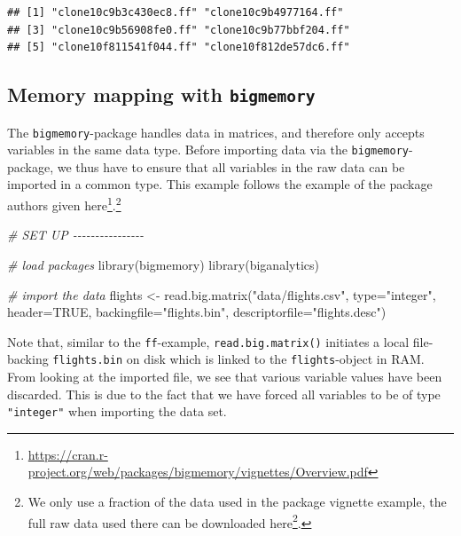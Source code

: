 \documentclass[
  12pt,
]{style/krantz}
\newenvironment{Shaded}{\begin{snugshade}}{\end{snugshade}}
\newcommand{\AttributeTok}[1]{\textcolor[rgb]{0.77,0.63,0.00}{#1}}
\newcommand{\CommentTok}[1]{\textcolor[rgb]{0.56,0.35,0.01}{\textit{#1}}}
\newcommand{\ConstantTok}[1]{\textcolor[rgb]{0.00,0.00,0.00}{#1}}
\newcommand{\FunctionTok}[1]{\textcolor[rgb]{0.00,0.00,0.00}{#1}}
\newcommand{\NormalTok}[1]{#1}
\newcommand{\OtherTok}[1]{\textcolor[rgb]{0.56,0.35,0.01}{#1}}
\newcommand{\StringTok}[1]{\textcolor[rgb]{0.31,0.60,0.02}{#1}}
\renewcommand{\href}[2]{#2\footnote{\url{#1}}}
\begin{document}
\begin{verbatim}
## [1] "clone10c9b3c430ec8.ff" "clone10c9b4977164.ff" 
## [3] "clone10c9b56908fe0.ff" "clone10c9b77bbf204.ff"
## [5] "clone10f811541f044.ff" "clone10f812de57dc6.ff"
\end{verbatim}

\hypertarget{memory-mapping-with-bigmemory}{%
\subsection{\texorpdfstring{Memory mapping with \texttt{bigmemory}}{Memory mapping with bigmemory}}\label{memory-mapping-with-bigmemory}}

The \texttt{bigmemory}-package handles data in matrices, and therefore only accepts variables in the same data type. Before importing data via the \texttt{bigmemory}-package, we thus have to ensure that all variables in the raw data can be imported in a common type. This example follows the example of the package authors given \href{https://cran.r-project.org/web/packages/bigmemory/vignettes/Overview.pdf}{here}.\footnote{We only use a fraction of the data used in the package vignette example, the full raw data used there can be downloaded \href{http://stat-computing.org/dataexpo/2009/the-data.html}{here}.}

\begin{Shaded}
\begin{Highlighting}[]
\CommentTok{\# SET UP {-}{-}{-}{-}{-}{-}{-}{-}{-}{-}{-}{-}{-}{-}{-}{-}}

\CommentTok{\# load packages}
\FunctionTok{library}\NormalTok{(bigmemory)}
\FunctionTok{library}\NormalTok{(biganalytics)}

\CommentTok{\# import the data}
\NormalTok{flights }\OtherTok{\textless{}{-}} \FunctionTok{read.big.matrix}\NormalTok{(}\StringTok{"data/flights.csv"}\NormalTok{,}
                     \AttributeTok{type=}\StringTok{"integer"}\NormalTok{,}
                     \AttributeTok{header=}\ConstantTok{TRUE}\NormalTok{,}
                     \AttributeTok{backingfile=}\StringTok{"flights.bin"}\NormalTok{,}
                     \AttributeTok{descriptorfile=}\StringTok{"flights.desc"}\NormalTok{)}
\end{Highlighting}
\end{Shaded}

Note that, similar to the \texttt{ff}-example, \texttt{read.big.matrix()} initiates a local file-backing \texttt{flights.bin} on disk which is linked to the \texttt{flights}-object in RAM. From looking at the imported file, we see that various variable values have been discarded. This is due to the fact that we have forced all variables to be of type \texttt{"integer"} when importing the data set.
\end{document}
